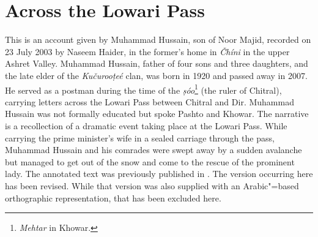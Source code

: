 \appendix
{}

\section*{Across the Lowari Pass}

This is an account given by Muhammad Hussain, son of Noor Majid, recorded on 23 July 2003 by Naseem Haider, in the former’s home in \textit{Čhíni} in the upper Ashret Valley. Muhammad Hussain, father of four sons and three daughters, and the late elder of the \textit{Kučurooṭeé} clan, was born in 1920 and passed away in 2007. He served as a postman during the time of the \textit{ṣóo}\footnote{\textit{Mehtar} in Khowar.} (the ruler of Chitral), carrying letters across the Lowari Pass between Chitral and Dir. Muhammad Hussain was not formally educated but spoke Pashto and Khowar. The narrative is a recollection of a dramatic event taking place at the Lowari Pass. While carrying the prime minister’s wife in a sealed carriage through the pass, Muhammad Hussain and his comrades were swept away by a sudden avalanche but managed to get out of the snow and come to the rescue of the prominent lady. The annotated text was previously published in \citet[131--137]{liljegrenhaider2015}. The version occurring here has been revised. While that version was also supplied with an Arabic"=based orthographic representation, that has been excluded here.


